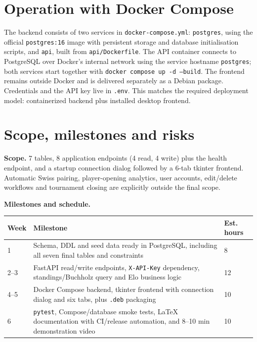 \documentclass[11pt,a4paper]{article}
\begin{document}
\section{Operation with Docker Compose}

The backend consists of two services in \texttt{docker-compose.yml}:
\texttt{postgres}, using the official \texttt{postgres:16} image with persistent
storage and database initialisation scripts, and \texttt{api}, built from
\texttt{api/Dockerfile}. The API container connects to PostgreSQL over Docker's
internal network using the service hostname \texttt{postgres}; both services
start together with \texttt{docker compose up -d --build}. The frontend remains
outside Docker and is delivered separately as a Debian package. Credentials and
the API key live in \texttt{.env}. This matches the required deployment model:
containerized backend plus installed desktop frontend.

\section{Scope, milestones and risks}

\textbf{Scope.} 7 tables, 8 application endpoints (4 read, 4 write) plus the
health endpoint, and a startup connection dialog followed by a 6-tab tkinter
frontend. Automatic Swiss pairing, player-opening analytics, user accounts,
edit/delete workflows and tournament closing are explicitly outside the final
scope.

\textbf{Milestones and schedule.}

\renewcommand{\arraystretch}{1.2}
\begin{tabularx}{\linewidth}{@{}p{1.4cm}Xp{1.8cm}@{}}
\toprule
\textbf{Week} & \textbf{Milestone} & \textbf{Est. hours} \\
\midrule
1     & Schema, DDL and seed data ready in PostgreSQL, including all seven final tables and constraints & 8 \\
2--3  & FastAPI read/write endpoints, \texttt{X-API-Key} dependency, standings/Buchholz query and Elo business logic & 12 \\
4--5  & Docker Compose backend, tkinter frontend with connection dialog and six tabs, plus \texttt{.deb} packaging & 10 \\
6     & \texttt{pytest}, Compose/database smoke tests, LaTeX documentation with CI/release automation, and 8--10 min demonstration video & 10 \\
\bottomrule
\end{tabularx}
\end{document}
